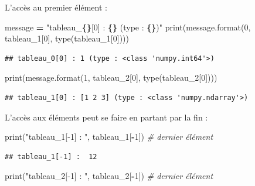 \documentclass[
  12pt,
]{book}
\newenvironment{Shaded}{\begin{snugshade}}{\end{snugshade}}
\newcommand{\BuiltInTok}[1]{#1}
\newcommand{\CommentTok}[1]{\textcolor[rgb]{0.56,0.35,0.01}{\textit{#1}}}
\newcommand{\DecValTok}[1]{\textcolor[rgb]{0.00,0.00,0.81}{#1}}
\newcommand{\NormalTok}[1]{#1}
\newcommand{\OperatorTok}[1]{\textcolor[rgb]{0.81,0.36,0.00}{\textbf{#1}}}
\newcommand{\SpecialCharTok}[1]{\textcolor[rgb]{0.81,0.36,0.00}{\textbf{#1}}}
\newcommand{\StringTok}[1]{\textcolor[rgb]{0.31,0.60,0.02}{#1}}
\numberwithin{equation}{section}
\numberwithin{countremarque}{section}
\begin{document}
L'accès au premier élément :

\begin{Shaded}
\begin{Highlighting}[]
\NormalTok{message }\OperatorTok{=} \StringTok{"tableau\_}\SpecialCharTok{\{\}}\StringTok{[0] : }\SpecialCharTok{\{\}}\StringTok{ (type : }\SpecialCharTok{\{\}}\StringTok{)"}
\BuiltInTok{print}\NormalTok{(message.}\BuiltInTok{format}\NormalTok{(}\DecValTok{0}\NormalTok{, tableau\_1[}\DecValTok{0}\NormalTok{], }\BuiltInTok{type}\NormalTok{(tableau\_1[}\DecValTok{0}\NormalTok{])))}
\end{Highlighting}
\end{Shaded}

\begin{lstlisting}
## tableau_0[0] : 1 (type : <class 'numpy.int64'>)
\end{lstlisting}

\begin{Shaded}
\begin{Highlighting}[]
\BuiltInTok{print}\NormalTok{(message.}\BuiltInTok{format}\NormalTok{(}\DecValTok{1}\NormalTok{, tableau\_2[}\DecValTok{0}\NormalTok{], }\BuiltInTok{type}\NormalTok{(tableau\_2[}\DecValTok{0}\NormalTok{])))}
\end{Highlighting}
\end{Shaded}

\begin{lstlisting}
## tableau_1[0] : [1 2 3] (type : <class 'numpy.ndarray'>)
\end{lstlisting}

L'accès aux éléments peut se faire en partant par la fin :

\begin{Shaded}
\begin{Highlighting}[]
\BuiltInTok{print}\NormalTok{(}\StringTok{"tableau\_1[{-}1] : "}\NormalTok{, tableau\_1[}\OperatorTok{{-}}\DecValTok{1}\NormalTok{]) }\CommentTok{\# dernier élément}
\end{Highlighting}
\end{Shaded}

\begin{lstlisting}
## tableau_1[-1] :  12
\end{lstlisting}

\begin{Shaded}
\begin{Highlighting}[]
\BuiltInTok{print}\NormalTok{(}\StringTok{"tableau\_2[{-}1] : "}\NormalTok{, tableau\_2[}\OperatorTok{{-}}\DecValTok{1}\NormalTok{]) }\CommentTok{\# dernier élément}
\end{Highlighting}
\end{Shaded}
\end{document}
